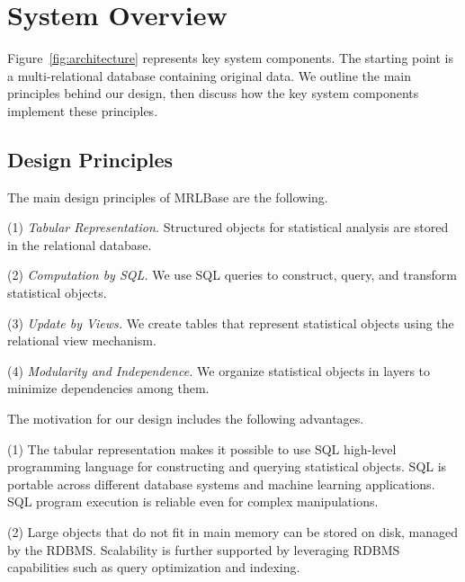 \documentclass{acm_proc_article-sp}
\begin{document}
\section{System Overview} 



Figure~\ref{fig:architecture} represents key system components. The starting point is a multi-relational database containing original data. 
We outline the main principles behind our design, then discuss how the key system components implement these principles.

\subsection{Design Principles} \label{sec:design} The main design principles of MRLBase are the following. 

(1) {\em Tabular Representation.} Structured objects for statistical analysis are stored in the relational database. 

(2) {\em Computation by SQL.} We use SQL queries to construct, query, and transform statistical objects. 

(3) {\em Update by Views.} We create tables that represent statistical objects using the relational view mechanism. 

(4) {\em Modularity and Independence.} We organize statistical objects in layers to minimize dependencies among them. 



The motivation for our design includes the following advantages. 

(1) The tabular representation makes it possible to use SQL high-level programming language for constructing and querying statistical objects. SQL is portable across different database systems and machine learning applications.  SQL program execution is reliable even for complex manipulations.

(2) Large objects that do not fit in main memory can be stored on disk, managed by the RDBMS. Scalability is further supported by leveraging RDBMS capabilities such as query optimization and indexing.
\end{document}
